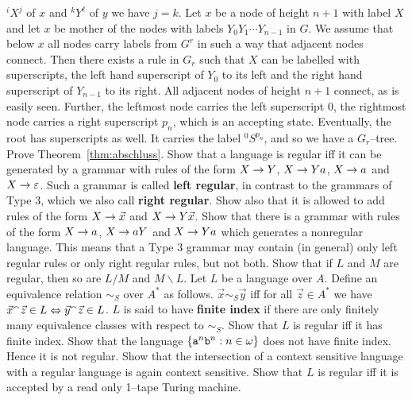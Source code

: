 ${^i X^j}$ of $x$ and $^k Y^{\ell}$ of $y$ we have $j = k$.
Let $x$ be a node of height $n+1$ with label $X$ and let $x$ be
mother of the nodes with labels $Y_0 Y_1 \dotsb Y_{n-1}$ in $G$.
We assume that below $x$ all nodes carry labels from $G^r$ in such
a way that adjacent nodes connect. Then there exists  a rule
in $G_r$ such that $X$ can be labelled with superscripts,
the left hand superscript of $Y_0$ to its left and the right hand
superscript of $Y_{n-1}$ to its right. All adjacent nodes of height
$n+1$ connect, as is easily seen. Further, the leftmost node
carries the left superscript 0, the rightmost node carries a
right superscript $p_n$, which is an accepting state. Eventually,
the root has superscripts as well. It carries the label
$^0 S^{p_n}$, and so we have a $G_r$--tree.
\proofend
\vplatz
\exercise
Prove Theorem~\ref{thm:abschluss}.
\vplatz
\exercise
Show that a language is regular iff it can be
generated by a grammar with rules of the form $X \rightarrow Y$,
$X \rightarrow Ya$, $X \rightarrow a$ and $X \rightarrow \varepsilon$. Such a
grammar is called
\textbf{left regular}, in contrast to the grammars of
Type 3, which we also call \textbf{right regular}.
Show also that it is allowed to add rules of the form
$X \rightarrow \vec{x}$ and $X \rightarrow Y \vec{x}$.
\vplatz
\exercise
Show that there is a grammar with rules of the form
$X \rightarrow a$, $X \rightarrow aY$ and $X \rightarrow Ya$ which generates a
nonregular language. This means that a Type 3 grammar may 
contain (in general) only left regular rules or only right 
regular rules, but not both.
\vplatz
\exercise
Show that if $L$ and $M$ are regular, then so are
$L/M$ and $M\backslash L$.
\vplatz
\exercise
Let $L$ be a language over $A$. Define an equivalence relation
$\sim_S$ over $A^{\ast}$ as follows.  $\vec{x} \sim_S \vec{y}$ iff
for all $\vec{z} \in A^{\ast}$ we have
$\vec{x} {^{\smallfrown}} \vec{z} \in L \Leftrightarrow \vec{y} {^{\smallfrown}}
\vec{z} \in L$. $L$ is said to have \textbf{finite index}
if there are only finitely many equivalence classes
with respect to $\sim_S$. Show that $L$ is regular iff
it has finite index.
\vplatz
\exercise
\label{ue:index}
Show that the language $\{\mbox{\tt a}^n\mbox{\tt b}^n :
n \in \omega\}$ does not have finite index. Hence it is
not regular.
\vplatz
\exercise
Show that the intersection of a context sensitive language with
a regular language is again context sensitive.
\vplatz
\exercise
Show that $L$ is regular iff it is accepted by a read
only 1--tape Turing machine.
